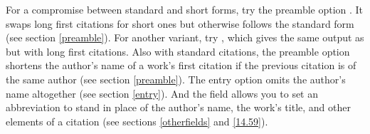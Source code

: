 \documentclass[11pt,letterpaper,oneside]{article}
\begin{document}

\begin{citeonly}
\item \cite[3]{morrison2004a}
\item \cite[18]{morrison2004a}
\item \cite[18]{morrison2004a}
\item \cite[24--26]{morrison2004a}
\item \cite[401-2]{morrison2004b}
\item \cite[433]{morrison2004b}
\item \cite[37--38]{diaz2008}
\item \cite[403]{morrison2004b}
\item \cite[152]{diaz2008}
\item \cite[201-2]{diaz2008}
\item \cites[240]{morrison2004b}[32]{morrison2004a}
\item \cite[33]{morrison2004a}
\end{citeonly}

For a compromise between standard and short forms, try the  preamble
option . It swaps long first citations for short ones
but otherwise follows the standard form (see section \ref{preamble}).
For another variant, try , which gives the same output
as  but with long first citations. Also with standard
citations, the preamble option  shortens the author's
name of a work's first citation if the previous citation is of the
same author (see section \ref{preamble}). The entry option
 omits the author's name altogether (see section
\ref{entry}). And the  field allows you to set an
abbreviation to stand in place of the author's name, the work's title,
and other elements of a citation (see sections \ref{otherfields} and
\ref{14.59}).
\end{document}
